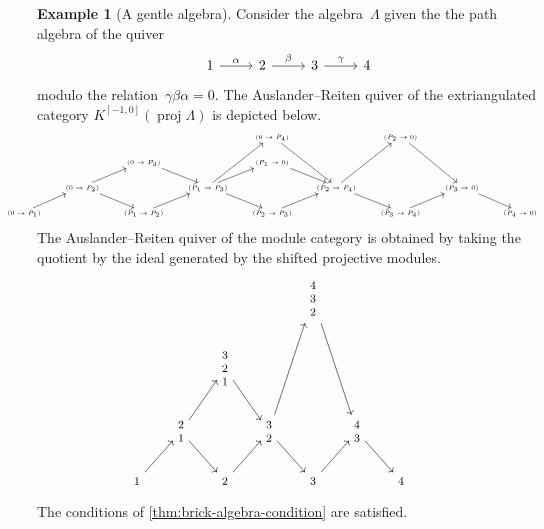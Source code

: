 \documentclass{amsart}
\theoremstyle{definition}
\newtheorem{example}[theorem]{Example}
\newcommand{\proj}{\operatorname{proj}}
\begin{document}
\begin{example}[A gentle algebra]
Consider the algebra~$\Lambda$ given the the path algebra of the quiver
\[
\begin{tikzcd}
	1 \arrow[r, "\alpha"] & 2\arrow[r, "\beta"] & 3\arrow[r, "\gamma"] & 4
\end{tikzcd}
\]
modulo the relation~$\gamma\beta\alpha = 0$. The Auslander--Reiten quiver of the extriangulated category $K^{[-1, 0]}(\proj\Lambda)$ is depicted below.
\[
\hspace*{-1cm}
{\tiny
\begin{tikzcd}
	&&&& (0\to P_4)\arrow[ddr] && (P_2\to 0)\arrow[ddr] && \\
	&& (0\to P_3)\arrow[dr] && (P_1\to 0)\arrow[dr] &&&& \\
	& (0\to P_2)\arrow[dr]\arrow[ur] && (P_1\to P_3)\arrow[uur]\arrow[ur]\arrow[dr] && (P_2\to P_4)\arrow[uur]\arrow[dr] && (P_3\to 0)\arrow[dr] & \\
	(0\to P_1) \arrow[ur] && (P_1\to P_2)\arrow[ur] && (P_2\to P_3)\arrow[ur]  && (P_3\to P_4)\arrow[ur] && (P_4\to 0)
\end{tikzcd}
}
\]
The Auslander--Reiten quiver of the module category is obtained by taking the quotient by the ideal generated by the shifted projective modules.
\[
\hspace*{-1cm}
{\footnotesize
\begin{tikzcd}
    &&&& \begin{matrix} 4\\3\\2 \end{matrix}\arrow[ddr] && \\
    && \begin{matrix} 3\\2\\1 \end{matrix}\arrow[dr] &&&& \\
    & \begin{matrix} 2\\1 \end{matrix}\arrow[dr]\arrow[ur] && \begin{matrix} 3\\2 \end{matrix}\arrow[uur]\arrow[dr] && \begin{matrix} 4\\3 \end{matrix}\arrow[dr] & \\
    \begin{matrix} 1 \end{matrix} \arrow[ur] && \begin{matrix} 2 \end{matrix}\arrow[ur] && \begin{matrix} 3 \end{matrix}\arrow[ur] && \begin{matrix}4 \end{matrix}
\end{tikzcd}
}
\]
The conditions of \cref{thm:brick-algebra-condition} are satisfied.
\end{example}
\end{document}
